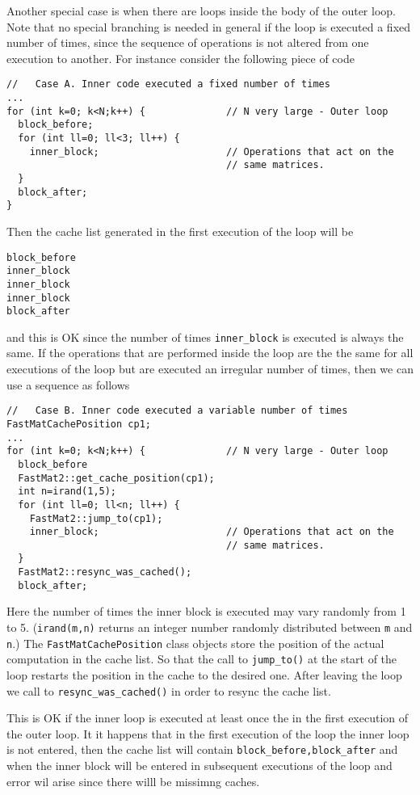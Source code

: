 Another special case is when there are loops inside the body of the
outer loop.  Note that no special branching is needed in general if
the loop is executed a fixed number of times, since the sequence of
operations is not altered from one execution to another.  
For instance consider the following piece of code
%
\begin{verbatim}
//   Case A. Inner code executed a fixed number of times
...
for (int k=0; k<N;k++) {              // N very large - Outer loop 
  block_before;
  for (int ll=0; ll<3; ll++) {
    inner_block;                      // Operations that act on the
                                      // same matrices.
  }
  block_after;
}
\end{verbatim}
%
Then the cache list generated in the first execution of the loop will
be
%
\begin{verbatim}
block_before
inner_block
inner_block
inner_block
block_after
\end{verbatim}
%
and this is OK since the number of times \verb+inner_block+ is
executed is always the same.  If the operations that are performed
inside the loop are the the same for all executions of the loop but
are executed an irregular number of times, then we can use a sequence
as follows
%
\begin{verbatim}
//   Case B. Inner code executed a variable number of times
FastMatCachePosition cp1;
...
for (int k=0; k<N;k++) {              // N very large - Outer loop 
  block_before
  FastMat2::get_cache_position(cp1);
  int n=irand(1,5);
  for (int ll=0; ll<n; ll++) {
    FastMat2::jump_to(cp1);
    inner_block;                      // Operations that act on the
                                      // same matrices.
  }
  FastMat2::resync_was_cached();
  block_after;
\end{verbatim}
%
Here the number of times the inner block is executed may vary randomly
from 1 to 5.  (\verb+irand(m,n)+ returns an integer number randomly
distributed between \verb+m+ and \verb+n+.) The
\verb+FastMatCachePosition+ class objects store the position of the
actual computation in the cache list. So that the call to
\verb+jump_to()+ at the start of the loop restarts the position in the
cache to the desired one. After leaving the loop we call to
\verb+resync_was_cached()+ in order to resync the cache list. 

This is OK if the inner loop is executed at least once the in the
first execution of the outer loop. It it happens that in the first
execution of the loop the inner loop is not entered, then the cache
list will contain \verb|block_before,block_after| and when the inner
block will be entered in subsequent executions of the loop and error
wil arise since there willl be missimng caches. 

